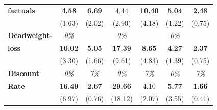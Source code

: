 \documentclass[static]{JJH-Beamer}
\begin{document}
\begin{frame}
\begin{table}[H]
\begin{center}
{\begin{tabular}{>{\bfseries}lcc|cc|cc}
factuals	&	\textbf{4.58}	&	\textbf{6.69}	&	4.44	&	\textbf{10.40}	&	\textbf{5.04}	&	\textbf{2.48}	\\
	&	(1.63)	&	(2.02)	&	(2.90)	&	(4.18)	&	(1.22)	&	(0.75)	\\ \midrule
Deadweight-	&	\textit{0\%}	&	\textit{100\%\textit}	&	\textit{0\%}	&	\textit{100\%\textit}	&	\textit{0\%}	&	\textit{100\%\textit}	\\
loss	&	\textbf{10.02}	&	\textbf{5.05}	&	\textbf{17.39}	&	\textbf{8.65}	&	\textbf{4.27}	&	\textbf{2.37}	\\
	&	(3.30)	&	(1.66)	&	(9.61)	&	(4.83)	&	(1.39)	&	(0.75)	\\ \midrule
Discount 	&	\textit{0\%}	&	\textit{7\%}	&	\textit{0\%}	&	\textit{7\%}	&	\textit{0\%}	&	\textit{7\%}	\\
Rate	&	\textbf{16.49}	&	\textbf{2.67}	&	\textbf{29.66}	&	4.10	&	\textbf{5.77}	&	\textbf{1.66}	\\
	&	(6.97)	&	(0.76)	&	(18.12)	&	(2.07)	&	(3.55)	&	(0.41)	\\
\bottomrule
\end{tabular}
}
\end{center}
\end{table}

\end{frame}
\end{document}
